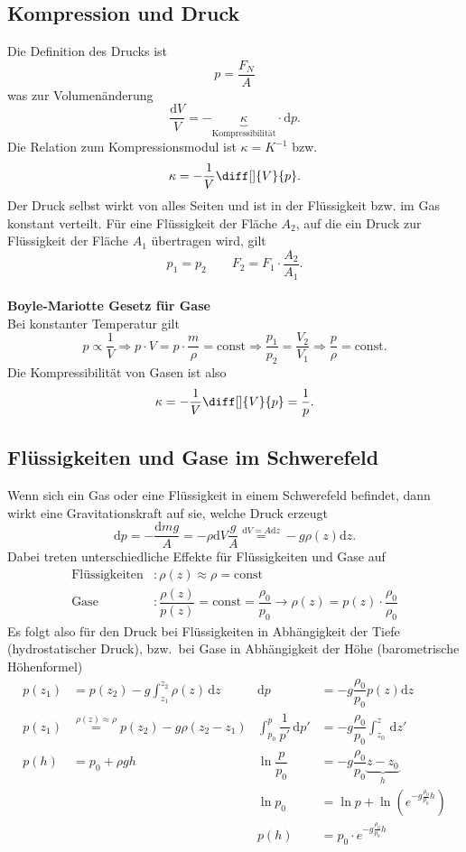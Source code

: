 \documentclass[a4paper,12pt]{article}
\newcommand{\td}{\,\text{d}}
\begin{document}
\subsection{Kompression und Druck}
Die Definition des Drucks ist 
\[ 
        p=\dfrac{F_N}{A}
\] 
was zur Volumenänderung
\[ 
        \dfrac{\text{d}V}{V}=-\underbrace{\kappa}_{\text{Kompressibilität}}\cdot \text{d}p
.\] 
Die Relation zum Kompressionsmodul ist $\kappa=K^{-1}$ bzw.
\[ 
        \kappa=-\dfrac{1}{V}\diff[]{V}{p}
.\] 
Der Druck selbst wirkt von alles Seiten und ist in der Flüssigkeit bzw. im Gas konstant verteilt. Für eine Flüssigkeit der Fläche $A_2$, auf die ein Druck zur Flüssigkeit der Fläche $A_1$ übertragen wird, gilt
\[ 
        p_1=p_2\qquad F_2=F_1\cdot \dfrac{A_2}{A_1} 
.\] 
\hfill\\\textbf{Boyle-Mariotte Gesetz für Gase}\\ 
Bei konstanter Temperatur gilt 
\[ 
        p\propto \dfrac{1}{V}\Rightarrow p\cdot V=p\cdot \dfrac{m}{\rho }=\text{const}\Rightarrow \dfrac{p_1}{p_2}=\dfrac{V_2}{V_1}\Rightarrow \dfrac{p}{\rho }=\text{const}
.\] 
Die Kompressibilität von Gasen ist also 
\[ 
        \kappa=-\dfrac{1}{V}\diff[]{V}{p}=\dfrac{1}{p}
.\] 

\subsection{Flüssigkeiten und Gase im Schwerefeld}
Wenn sich ein Gas oder eine Flüssigkeit in einem Schwerefeld befindet, dann wirkt eine Gravitationskraft auf sie, welche Druck erzeugt
\[ 
        \text{d}p=-\dfrac{\text{d}mg}{A}=-\rho \text{d}V\dfrac{g}{A}\stackrel{\text{d}V=A\text{d}z}{=}-g\rho \left(z\right)\text{d}z
.\] 
Dabei treten unterschiedliche Effekte für Flüssigkeiten und Gase auf
\begin{align*}
        \text{Flüssigkeiten}&:\rho \left(z\right)\approx \rho =\text{const}\\
        \text{Gase}&:\dfrac{\rho \left(z\right)}{p\left(z\right)}=\text{const}=\dfrac{\rho _0}{p_0}\rightarrow \rho \left(z\right)=p\left(z\right)\cdot \dfrac{\rho _0}{\rho _0}
\end{align*}
Es folgt also für den Druck bei Flüssigkeiten in Abhängigkeit der Tiefe (hydrostatischer Druck), bzw.\ bei Gase in Abhängigkeit der Höhe (barometrische Höhenformel)
\begin{align*}
        p\left(z_1\right)&=p\left(z_2\right)-g\int_{z_1}^{z_2}\rho \left(z\right)\td z&\text{d}p&=-g\dfrac{\rho _0}{p_0}p\left(z\right)\text{d}z\\
        p\left(z_1\right)&\stackrel{\rho \left(z\right)\approx \rho }{=}p\left(z_2\right)-g\rho \left(z_2-z_1\right)&\int_{p_0}^{p}\dfrac{1}{p'}\td p'&=-g\dfrac{\rho _0}{p_0}\int_{z_0}^{z}\td z'\\
        p\left(h\right)&=p_0+\rho gh&\ln \dfrac{p}{p_0}&=-g\dfrac{\rho _0}{p_0}\underbrace{z-z_0}_{h}\\
                       &&\ln p_0&=\ln p+\ln\left(e^{-g\tfrac{\rho _0}{p_0}h}\right)\\
                       &&p\left(h\right)&=p_0\cdot e^{-g\tfrac{\rho _0}{p_0}h}
\end{align*}
\end{document}
